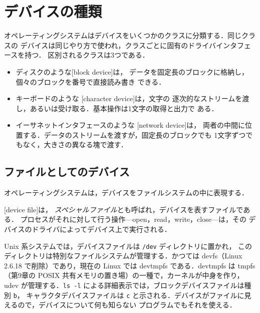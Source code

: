 \documentclass[../main.tex]{subfiles}
\begin{document}
\section{デバイスの種類}
\label{sec:l11-types}

オペレーティングシステムはデバイスをいくつかのクラスに分類する．同じクラスの
デバイスは同じやり方で使われ，クラスごとに固有のドライバインタフェースを持つ．
区別されるクラスは3つである．
\begin{itemize}
  \item ディスクのような[block device]は，
    データを固定長のブロックに格納し，個々のブロックを番号で直接読み書き
    できる．
  \item キーボードのような
    [character device]は，文字の
    逐次的なストリームを渡し，あるいは受け取る．基本操作は1文字の取得と出力で
    ある．
  \item イーサネットインタフェースのような
    [network device]は，
    両者の中間に位置する．データのストリームを渡すが，固定長のブロックでも
    1文字ずつでもなく，大きさの異なる塊で渡す．
\end{itemize}

\subsection{ファイルとしてのデバイス}

オペレーティングシステムは，デバイスをファイルシステムの中に表現する．

\begin{definition}[デバイスファイル]
  [device file]は，
  \emph{スペシャルファイル}とも呼ばれ，デバイスを表すファイルである．
  プロセスがそれに対して行う操作---open，read，write，close---は，その
  デバイスのドライバによってデバイス上で実行される．
\end{definition}

Unix 系システムでは，デバイスファイルは \texttt{/dev} ディレクトリに置かれ，
このディレクトリは特別なファイルシステムが管理する．かつては devfs（Linux
2.6.18 で削除）であり，現在の Linux では devtmpfs である．devtmpfs は
tmpfs（第9章の POSIX 共有メモリの置き場）の一種で，カーネルが中身を作り，
udev が管理する．\texttt{ls -l}
による詳細表示では，ブロックデバイスファイルは種別 \texttt{b}，
キャラクタデバイスファイルは \texttt{c} と示される．デバイスがファイルに見えるので，デバイスについて何も知らない
プログラムでもそれを使える．
\end{document}
